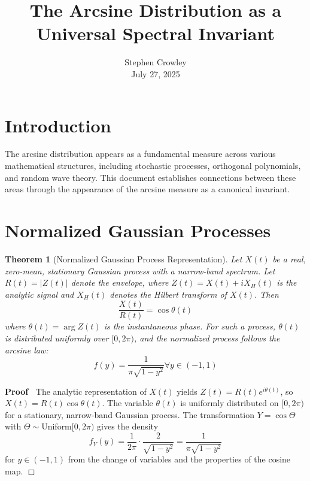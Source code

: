 \documentclass{article}
\newcommand{\tmaffiliation}[1]{\\ #1}
\newenvironment{proof}{\noindent\textbf{Proof\ }}{\hspace*{\fill}$\Box$\medskip}
\newtheorem{theorem}{Theorem}
\begin{document}
\title{The Arcsine Distribution as a Universal Spectral Invariant}

\author{
  Stephen Crowley
  \tmaffiliation{July 27, 2025}
}

\maketitle

{\tableofcontents}

\section{Introduction}

The arcsine distribution appears as a fundamental measure across various
mathematical structures, including stochastic processes, orthogonal
polynomials, and random wave theory. This document establishes connections
between these areas through the appearance of the arcsine measure as a
canonical invariant.

\section{Normalized Gaussian Processes}

\begin{theorem}
  [Normalized Gaussian Process Representation] Let $X (t)$ be a real,
  zero-mean, stationary Gaussian process with a narrow-band spectrum. Let $R
  (t) = |Z (t) |$ denote the envelope, where $Z (t) = X (t) + iX_H (t)$ is the
  analytic signal and $X_H (t)$ denotes the Hilbert transform of $X (t)$. Then
  \begin{equation}
    \frac{X (t)}{R (t)} = \cos \theta (t)
  \end{equation}
  where $\theta (t) = \arg Z (t)$ is the instantaneous phase. For such a
  process, $\theta (t)$ is distributed uniformly over $[0, 2 \pi)$, and the
  normalized process follows the arcsine law:
  \begin{equation}
    f (y) = \frac{1}{\pi \sqrt{1 - y^2}} \forall y \in (- 1, 1)
  \end{equation}
\end{theorem}

\begin{proof}
  The analytic representation of $X (t)$ yields $Z (t) = R (t) e^{i \theta
  (t)}$, so $X (t) = R (t) \cos \theta (t)$. The variable $\theta (t)$ is
  uniformly distributed on $[0, 2 \pi)$ for a stationary, narrow-band Gaussian
  process. The transformation $Y = \cos \Theta$ with $\Theta \sim
  \text{Uniform} [0, 2 \pi)$ gives the density
  \begin{equation}
    f_Y (y) = \frac{1}{2 \pi} \cdot \frac{2}{\sqrt{1 - y^2}} = \frac{1}{\pi
    \sqrt{1 - y^2}}
  \end{equation}
  for $y \in (- 1, 1)$ from the change of variables and the properties of the
  cosine map.
\end{proof}
\end{document}
